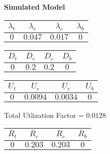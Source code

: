 \documentclass{article}
\begin{document}
\begin{minipage}{0.5\textwidth}
\centering	\textbf{Simulated Model}
\begin{table}[H]
\centering
\begin{tabular}{@{}cccc@{}}
\toprule
$\lambda_t$ & $\lambda_e$ & $\lambda_c$ & $\lambda_b$\\
\midrule
$0$ & $0.047$ & $0.017$ & $0$\\
\bottomrule
\end{tabular}
\end{table}
\begin{table}[H]
\centering
\begin{tabular}{@{}cccc@{}}
\toprule
$D_t$ & $D_e$ & $D_c$ & $D_b$\\
\midrule
$0$ & $0.2$ & $0.2$ & $0$\\
\bottomrule
\end{tabular}
\end{table}\begin{table}[H]
\centering
\begin{tabular}{@{}cccc@{}}
\toprule
$U_t$ & $U_e$ & $U_c$ & $U_b$\\
\midrule
$0$ & $0.0094$ & $0.0034$ & $0$\\
\bottomrule
\end{tabular}
\end{table}
\centering Total Utlization Factor = $0.0128$
\begin{table}[H]
\centering
\begin{tabular}{@{}cccc@{}}
\toprule
$R_t$ & $R_e$ & $R_c$ & $R_b$\\
\midrule
$0$ & $0.203$ & $0.203$ & $0$\\
\bottomrule
\end{tabular}
\end{table}
\end{minipage}
\end{document}
